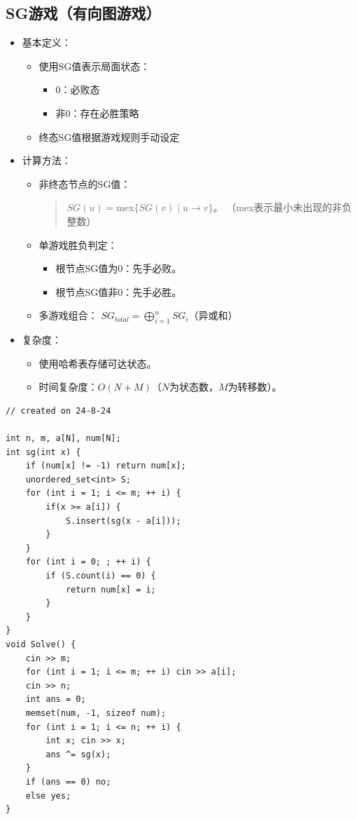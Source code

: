 \documentclass[a4paper,12pt]{article}
\begin{document}
\subsection{SG游戏（有向图游戏）}

\begin{itemize}
    \item 基本定义：
    \begin{itemize}
        \item 使用SG值表示局面状态：
        \begin{itemize}
            \item $0$：必败态
            \item 非$0$：存在必胜策略
        \end{itemize}
        \item 终态SG值根据游戏规则手动设定
    \end{itemize}
    
    \item 计算方法：
    \begin{itemize}
        \item 非终态节点的SG值：
        \begin{quote}
        \( SG(u) = \text{mex}\{SG(v) \mid u \to v\} \)。
        （mex表示最小未出现的非负整数）
        \end{quote}
        \item 单游戏胜负判定：
        \begin{itemize}
            \item 根节点SG值为$0$：先手必败。
            \item 根节点SG值非$0$：先手必胜。
        \end{itemize}
        \item 多游戏组合：
        \( SG_{total} = \bigoplus_{i=1}^n SG_i \)（异或和）
    \end{itemize}
    
    \item 复杂度：
    \begin{itemize}
        \item 使用哈希表存储可达状态。
        \item 时间复杂度：$O(N + M)$（$N$为状态数，$M$为转移数）。
    \end{itemize}
\end{itemize}

\begin{lstlisting}
// created on 24-8-24

int n, m, a[N], num[N];
int sg(int x) {
    if (num[x] != -1) return num[x];
    unordered_set<int> S;    
    for (int i = 1; i <= m; ++ i) {
        if(x >= a[i]) {
            S.insert(sg(x - a[i]));
        }
    }
    for (int i = 0; ; ++ i) {
        if (S.count(i) == 0) {
            return num[x] = i;            
        }
    }
}
void Solve() {
    cin >> m;
    for (int i = 1; i <= m; ++ i) cin >> a[i];
    cin >> n;
    int ans = 0; 
    memset(num, -1, sizeof num);
    for (int i = 1; i <= n; ++ i) {
        int x; cin >> x;
        ans ^= sg(x);
    }
    if (ans == 0) no;
    else yes;
}
\end{lstlisting}
\end{document}
